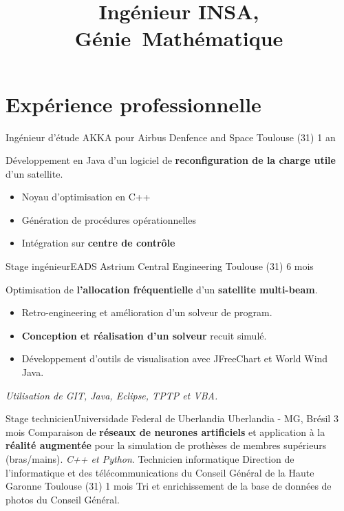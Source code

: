 \documentclass[10pt,a4paper,sans]{moderncv}%
\title{Ingénieur INSA, \mbox{Génie Mathématique}}
\begin{document}
\maketitle
\vspace{-1cm} %

\section{Expérience professionnelle}
    {Ingénieur d'étude}
    {AKKA pour Airbus Denfence and Space}
    {Toulouse (31)}
    {1 an}
    {
        Développement en Java d'un logiciel de \textbf{reconfiguration de la charge utile} d'un satellite.
        \begin{itemize}
            \item Noyau d'optimisation en C++
            \item Génération de procédures opérationnelles
            \item Intégration sur \textbf{centre de contrôle}
        \end{itemize}
    }
    {Stage ingénieur}{EADS Astrium Central Engineering}
    {Toulouse (31)}
    {6 mois}
    {
        Optimisation de \textbf{l'allocation fréquentielle} d'un \textbf{satellite multi-beam}.
        \begin{itemize}
            \item Retro-engineering et amélioration d'un solveur de program.
            \item \textbf{Conception et réalisation d'un solveur} recuit simulé.
            \item Développement d'outils de visualisation avec JFreeChart et World Wind Java.
        \end{itemize}
        \textit{Utilisation  de GIT, Java, Eclipse, TPTP et VBA.}
    }
    {Stage technicien}{Universidade Federal de Uberlandia}
    {Uberlandia - MG, Brésil}
    {3 mois}
    {Comparaison de \textbf{réseaux de neurones artificiels} et application à la \textbf{réalité augmentée} pour la simulation de prothèses de membres supérieurs (bras/mains). \textit{C++ et Python}.}
    {Technicien informatique}
    {Direction de l'informatique et des télécommunications du Conseil Général de la Haute Garonne}
    {Toulouse (31)}
    {1 mois}
    {Tri et enrichissement de la base de données de photos du Conseil Général.}
\end{document}
